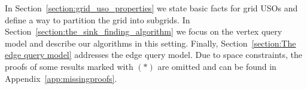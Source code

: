 \documentclass[runningheads,a4paper]{llncs}
\newcommand{\AT}[1]{\marginpar{\parbox{3.6cm}{{\small {\bf AT:} #1}}}} %
\begin{document}
In Section~\ref{section:grid_uso_properties} we state basic facts for grid USOs %
and define a way to partition the grid into subgrids. %
In Section~\ref{section:the_sink_finding_algorithm} we focus on the vertex query model and describe our algorithms in this setting. Finally, Section~\ref{section:The edge query model} addresses the edge query model. 
Due to space constraints, the proofs of some results marked with $(*)$ are omitted and can be found in Appendix~\ref{app:missingproofs}.







\end{document}
